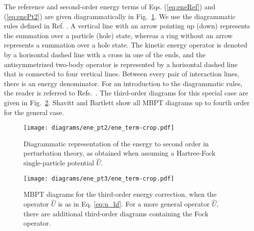 \documentclass[a4paper,12pt]{report}
\begin{document}
The reference and second-order energy terms of Eqs. (\ref{eq:eneRef}) and (\ref{eq:enePt2}) are given diagrammatically in Fig.~\ref{fig:diag_ene_pt2}. We use the diagrammatic rules defined in Ref. \cite{bartlett_book}. A vertical line with an arrow pointing up (down) represents the summation over a particle (hole) state, whereas a ring without an arrow represents a summation over a hole state. The kinetic energy operator is denoted by a horisontal dashed line with a cross in one of the ends, and the antisymmetrized two-body operator is represented by a horisontal dashed line that is connected to four vertical lines. Between every pair of interaction lines, there is an energy denominator. For an introduction to the diagrammatic rules, the reader is referred to Refs.~\cite{harris,bartlett_book,crawford}. The third-order diagrams for this special case are given in Fig.~\ref{fig:diag_ene_pt3}. Shavitt and Bartlett \cite{bartlett_book} show all MBPT diagrams up to fourth order for the general case.
 
\begin{figure}
  \centering
  \texttt{[image: diagrams/ene\_pt2/ene\_term-crop.pdf]}
  \caption{Diagrammatic representation of the energy to second order in perturbation theory, as obtained when assuming a Hartree-Fock single-particle potential $\hat{U}$.}  
  \label{fig:diag_ene_pt2}
\end{figure}


\begin{figure}
  \centering
  \texttt{[image: diagrams/ene\_pt3/ene\_term-crop.pdf]}
  \caption{MBPT diagrams for the third-order energy correction, when the operator $\hat{U}$ is as in Eq. \ref{eq:u_hf}. For a more general operator $\hat{U}$, there are additional third-order diagrams containing the Fock operator.}  
  \label{fig:diag_ene_pt3}
\end{figure}
\end{document}
